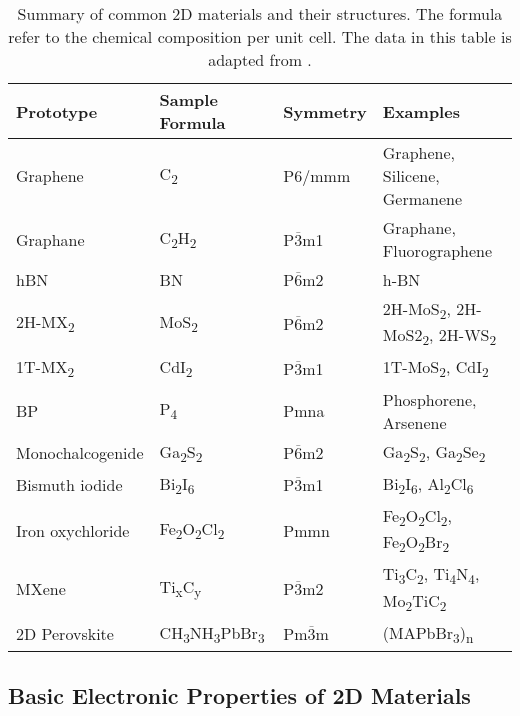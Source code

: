 \begin{table}[htbp]
  \centering
  \caption{Summary of common 2D materials and their structures. The
    formula refer to the chemical composition per unit cell. The data
    in this table is adapted from \cite{Haastrup_2018_database}.}
  \label{tab:category-2D}
  \begin{tabularx}{1.00\textwidth}{XXXX}
    \hline
    Prototype  & Sample Formula  & Symmetry & Examples \\
    \hline
    Graphene & C\textsubscript{2} &  P6/mmm & Graphene, Silicene, Germanene \\
    Graphane & C\textsubscript{2}H\textsubscript{2} &  P$\overline{3}$m1 & Graphane, Fluoro\-graphene\\
    hBN      & BN                & P$\overline{6}$m2 & h-BN \\
    2H-MX\textsubscript{2} & MoS\textsubscript{2} & P$\overline{6}$m2 & 2H-MoS\textsubscript{2}, 2H-MoS2\textsubscript{2}, 2H-WS\textsubscript{2} \\
    1T-MX\textsubscript{2} & CdI\textsubscript{2} & P$\overline{3}$m1 & 1T-MoS\textsubscript{2}, CdI\textsubscript{2}\\
    BP & P\textsubscript{4} & Pmna & Phosphorene, Arsenene \\
    Mono\-chalcogenide & Ga\textsubscript{2}S\textsubscript{2} & P$\overline{6}$m2 & Ga\textsubscript{2}S\textsubscript{2}, Ga\textsubscript{2}Se\textsubscript{2} \\
    Bismuth iodide &  Bi\textsubscript{2}I\textsubscript{6} & P$\overline{3}$m1 & Bi\textsubscript{2}I\textsubscript{6}, Al\textsubscript{2}Cl\textsubscript{6} \\
    Iron oxychloride                &  Fe\textsubscript{2}O\textsubscript{2}Cl\textsubscript{2} & Pmmn & Fe\textsubscript{2}O\textsubscript{2}Cl\textsubscript{2}, Fe\textsubscript{2}O\textsubscript{2}Br\textsubscript{2}  \\
    MXene & Ti\textsubscript{x}C\textsubscript{y} & P$\overline{3}$m2 & Ti\textsubscript{3}C\textsubscript{2}, Ti\textsubscript{4}N\textsubscript{4}, Mo\textsubscript{2}TiC\textsubscript{2} \\
    2D Perovskite & CH\textsubscript{3}NH\textsubscript{3}PbBr\textsubscript{3} & Pm$\overline{3}$m & (MAPbBr\textsubscript{3})\textsubscript{n}\\
   \hline
\end{tabularx}
\end{table}

\subsection{Basic Electronic Properties of 2D Materials}
\label{sec:basic-electr-prop}

